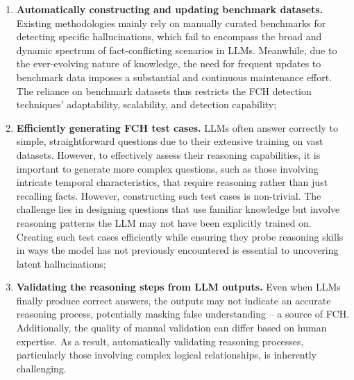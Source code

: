 \begin{enumerate}[itemsep=1mm, wide,  labelindent=9pt]
\item {\textbf{Automatically constructing and updating benchmark datasets.}} Existing methodologies mainly rely on manually curated benchmarks for detecting specific hallucinations, which fail to encompass the broad and dynamic spectrum of fact-conflicting scenarios in LLMs. 
Meanwhile, due to the ever-evolving nature of knowledge, the need for frequent updates to benchmark data imposes a substantial and continuous maintenance effort.
The reliance on benchmark datasets thus restricts the FCH detection techniques' adaptability, scalability, and  %
detection capability;  
\item {\textbf{Efficiently generating FCH test cases.}}
LLMs often answer correctly to simple, straightforward questions due to their extensive training on vast datasets. However, to effectively assess their reasoning capabilities, it is important to generate more complex questions, such as those involving intricate temporal characteristics, that require reasoning rather than just recalling facts. However, constructing such test cases is non-trivial. The challenge lies in designing questions that use familiar knowledge but involve reasoning patterns the LLM may not have been explicitly trained on. Creating such test cases efficiently while ensuring they probe reasoning skills in ways the model has not previously encountered is essential to uncovering latent hallucinations;
\item {\textbf{Validating the reasoning steps from LLM outputs.}} Even when LLMs finally produce correct answers, the outputs may not indicate an accurate reasoning process, potentially masking false understanding -- a source of FCH. Additionally, the quality of manual validation can differ based on human expertise. As a result, automatically validating reasoning processes, particularly those involving complex logical relationships, is inherently challenging. 
\vspace{1mm}
\end{enumerate}
